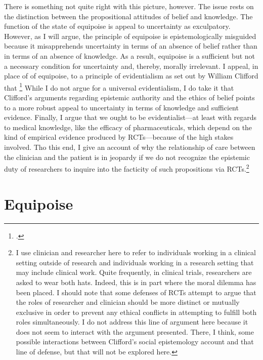 \documentclass[letterpaper,notitlepage,12pt]{article}
\begin{document}
There is something not quite right with this picture, however.
The issue rests on the distinction between the propositional attitudes of belief
and knowledge.
The function of the state of equipoise is appeal to uncertainty as exculpatory.
However, as I will argue, the principle of equipoise is epistemologically
misguided because it misapprehends uncertainty in terms of an absence of belief
rather than in terms of an absence of knowledge.
As a result, equipoise is a sufficient but not a necessary condition for
uncertainty and, thereby, morally irrelevant.
I appeal, in place of of equipoise, to a principle of evidentialism as set out
by William Clifford that \footcite[p. 346]{clifford_ethics_1886}
While I do not argue for a universal evidentialism, I do take it that Clifford's
arguments regarding epistemic authority and the ethics of belief points to a
more robust appeal to uncertainty in terms of knowledge and sufficient evidence.
Finally, I argue that we ought to be evidentialist---at least with regards to
medical knowledge, like the efficacy of pharmaceuticals, which depend on the
kind of empirical evidence produced by RCTs---because of the high stakes
involved.
Tho this end, I give an account of why the relationship of care between the
clinician and the patient is in jeopardy if we do not recognize the epistemic
duty of researchers to inquire into the facticity of such propositions via
RCTs.\footnote{I use clinician and researcher here to refer to individuals
  working in a clinical setting outside of research and individuals working in a
  research setting that may include clinical work. Quite frequently, in clinical
  trials, researchers are asked to wear both hats. Indeed, this is in part where
  the moral dilemma has been placed. I should note that some defenses of RCTs
  attempt to argue that the roles of researcher and clinician should be more
  distinct or mutually exclusive in order to prevent any ethical conflicts
  in attempting to fulfill both roles simultaneously. I do not address this line
  of argument here because it does not seem to interact with the argument
  presented. There, I think, some possible interactions between Clifford's
  social epistemology account and that line of defense, but that will not be
explored here.}

\section{Equipoise}
\end{document}
